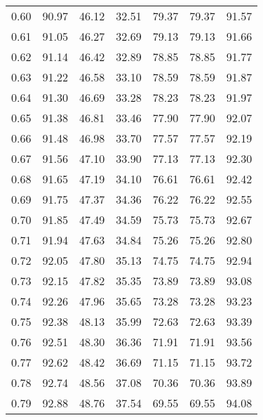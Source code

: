 \begin{tabular}{|c|c|c|c|c|c|c|}
      0.60 &     90.97 &     46.12 &      32.51 &   79.37 &      79.37 &         91.57 \\
      0.61 &     91.05 &     46.27 &      32.69 &   79.13 &      79.13 &         91.66 \\
      0.62 &     91.14 &     46.42 &      32.89 &   78.85 &      78.85 &         91.77 \\
      0.63 &     91.22 &     46.58 &      33.10 &   78.59 &      78.59 &         91.87 \\
      0.64 &     91.30 &     46.69 &      33.28 &   78.23 &      78.23 &         91.97 \\
      0.65 &     91.38 &     46.81 &      33.46 &   77.90 &      77.90 &         92.07 \\
      0.66 &     91.48 &     46.98 &      33.70 &   77.57 &      77.57 &         92.19 \\
      0.67 &     91.56 &     47.10 &      33.90 &   77.13 &      77.13 &         92.30 \\
      0.68 &     91.65 &     47.19 &      34.10 &   76.61 &      76.61 &         92.42 \\
      0.69 &     91.75 &     47.37 &      34.36 &   76.22 &      76.22 &         92.55 \\
      0.70 &     91.85 &     47.49 &      34.59 &   75.73 &      75.73 &         92.67 \\
      0.71 &     91.94 &     47.63 &      34.84 &   75.26 &      75.26 &         92.80 \\
      0.72 &     92.05 &     47.80 &      35.13 &   74.75 &      74.75 &         92.94 \\
      0.73 &     92.15 &     47.82 &      35.35 &   73.89 &      73.89 &         93.08 \\
      0.74 &     92.26 &     47.96 &      35.65 &   73.28 &      73.28 &         93.23 \\
      0.75 &     92.38 &     48.13 &      35.99 &   72.63 &      72.63 &         93.39 \\
      0.76 &     92.51 &     48.30 &      36.36 &   71.91 &      71.91 &         93.56 \\
      0.77 &     92.62 &     48.42 &      36.69 &   71.15 &      71.15 &         93.72 \\
      0.78 &     92.74 &     48.56 &      37.08 &   70.36 &      70.36 &         93.89 \\
      0.79 &     92.88 &     48.76 &      37.54 &   69.55 &      69.55 &         94.08 \\

\end{tabular}
